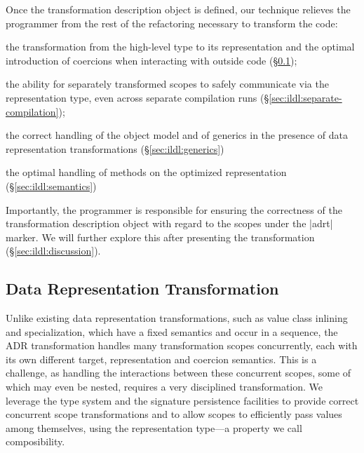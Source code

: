 Once the transformation description object is defined, our technique relieves the programmer from the rest of the refactoring necessary to transform the code:

\begin{compactitem}
\item the transformation from the high-level type to its representation and the optimal introduction of coercions when interacting with outside code (\S\ref{sec:ildl:ldl});
\item the ability for separately transformed scopes to safely communicate via the representation type, even across separate compilation runs (\S\ref{sec:ildl:separate-compilation});
\item the correct handling of the object model and of generics in the presence of data representation transformations (\S\ref{sec:ildl:generics})
\item the optimal handling of methods on the optimized representation (\S\ref{sec:ildl:semantics})
\end{compactitem}

Importantly, the programmer is responsible for ensuring the correctness of the transformation description object with regard to the scopes under the |adrt| marker. We will further explore this after presenting the transformation (\S\ref{sec:ildl:discussion}).












\subsection{Data Representation Transformation}
\label{sec:ildl:ldl}

Unlike existing data representation transformations, such as value class inlining and specialization, which have a fixed semantics and occur in a sequence, the ADR transformation handles many transformation scopes concurrently, each with its own different target, representation and coercion semantics. This is a challenge, as handling the interactions between these concurrent scopes, some of which may even be nested, requires a very disciplined transformation. We leverage the type system and the signature persistence facilities to provide correct concurrent scope transformations and to allow scopes to efficiently pass values among themselves, using the representation type---a property we call composibility.

